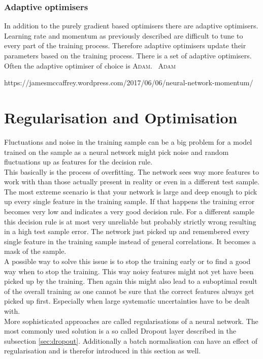 \subsubsection{Adaptive optimisers}

In addition to the purely gradient based optimisers there are adaptive optimisers. Learning rate and momentum as previously described are difficult to tune to every part of the training process. Therefore adaptive optimisers update their parameters based on the training process. There is a set of adaptive optimisers.~\cite{chollet2015keras}\\
Often the adaptive optimiser of choice is \textsc{Adam}.~\cite{2014arXiv1412.6980K} \textsc{Adam} 

https://jamesmccaffrey.wordpress.com/2017/06/06/neural-network-momentum/


\section{Regularisation and Optimisation}

Fluctuations and noise in the training sample can be a big problem for a model trained on the sample as a neural network might pick noise and random fluctuations up as features for the decision rule.\\
This basically is the process of overfitting. The network sees way more features to work with than those actually present in reality or even in a different test sample. The most extreme scenario is that your network is large and deep enough to pick up every single feature in the training sample. If that happens the training error becomes very low and indicates a very good decision rule. For a different sample this decision rule is at most very unreliable but probably strictly wrong resulting in a high test sample error. The network just picked up and remembered every single feature in the training sample instead of general correlations. It becomes a mask of the sample.\\
A possible way to solve this issue is to stop the training early or to find a good way when to stop the training. This way noisy features might not yet have been picked up by the training. Then again this might also lead to a suboptimal result of the overall training as one cannot be sure that the correct features always get picked up first. Especially when large systematic uncertainties have to be dealt with.\\
More sophisticated approaches are called regularisations of a neural network. The most commonly used solution is a so called Dropout layer described in the subsection \ref{sec:dropout}. Additionally a batch normalisation can have an effect of regularisation and is therefor introduced in this section as well.

